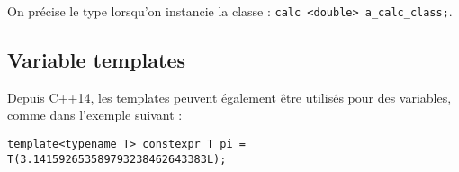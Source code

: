\documentclass[abstracton]{scrartcl}
\begin{document}
On précise le type lorsqu'on instancie la classe : \lstinline{calc <double> a_calc_class;}.



\subsection{Variable templates}

Depuis C++14, les templates peuvent également être utilisés pour des variables, comme dans l'exemple suivant :
\begin{lstlisting}
template<typename T> constexpr T pi = T(3.141592653589793238462643383L);
\end{lstlisting}


\end{document}
